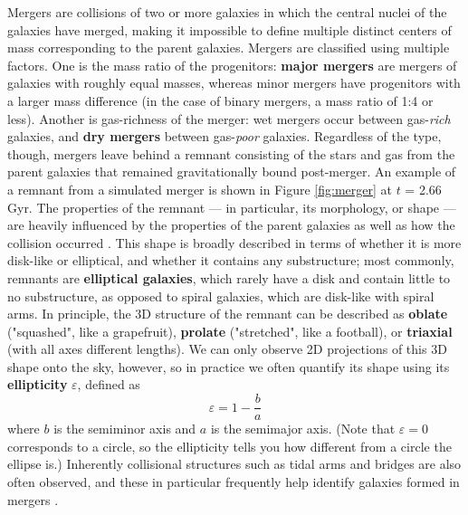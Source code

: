 \documentclass[twocolumn]{aastex631}
\begin{document}
Mergers are collisions of two or more galaxies in which the central nuclei of the galaxies have merged, making it impossible to define multiple distinct centers of mass corresponding to the parent galaxies.
Mergers are classified using multiple factors.
One is the mass ratio of the progenitors: \textbf{major mergers} are mergers of galaxies with roughly equal masses, whereas minor mergers have progenitors with a larger mass difference (in the case of binary mergers, a mass ratio of 1:4 or less).
Another is gas-richness of the merger: wet mergers occur between gas-\textit{rich} galaxies, and \textbf{dry mergers} between gas-\textit{poor} galaxies.
Regardless of the type, though, mergers leave behind a remnant consisting of the stars and gas from the parent galaxies that remained gravitationally bound post-merger. 
An example of a remnant from a simulated merger is shown in Figure \ref{fig:merger} at $t$ = 2.66 Gyr.
The properties of the remnant --- in particular, its morphology, or shape --- are heavily influenced by the properties of the parent galaxies as well as how the collision occurred \citep{Barnes+1992}. 
This shape is broadly described in terms of whether it is more disk-like or elliptical, and whether it contains any substructure; most commonly, remnants are \textbf{elliptical galaxies}, which rarely have a disk and contain little to no substructure, as opposed to spiral galaxies, which are disk-like with spiral arms.
In principle, the 3D structure of the remnant can be described as \textbf{oblate} ("squashed", like a grapefruit), \textbf{prolate} ("stretched", like a football), or \textbf{triaxial} (with all axes different lengths).
We can only observe 2D projections of this 3D shape onto the sky, however, so in practice we often quantify its shape using its \textbf{ellipticity} $\varepsilon$, defined as 
\begin{equation}\label{eq:ellipticity}
    \varepsilon = 1 - \frac{b}{a}
\end{equation}
where $b$ is the semiminor axis and $a$ is the semimajor axis.
(Note that $\varepsilon=0$ corresponds to a circle, so the ellipticity tells you how different from a circle the ellipse is.)
Inherently collisional structures such as tidal arms and bridges are also often observed, and these in particular frequently help identify galaxies formed in mergers \citep{Duc2013}.
\end{document}
